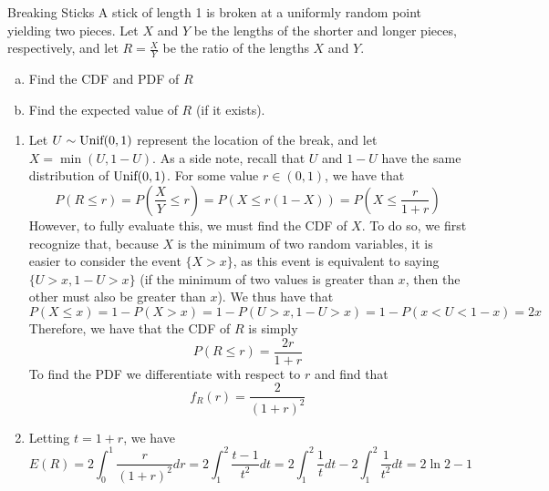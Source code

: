 \documentclass[11.5pt]{article}
\begin{document}




\begin{exercise}{Breaking Sticks}
A stick of length 1 is broken at a uniformly random point yielding two pieces. Let $X$ and $Y$ be the lengths of the shorter and longer pieces, respectively, and let $R = \frac{X}{Y}$ be the ratio of the lengths $X$ and $Y$. 
\begin{enumerate} [(a)]
\item Find the CDF and PDF of $R$
\item Find the expected value of $R$ (if it exists). 
\end{enumerate}

\begin{solution}{3} 
\begin{enumerate}
\item Let $U \sim \textrm{Unif}(0,1)$ represent the location of the break, and let $X = \min(U, 1-U)$. As a side note, recall that $U$ and $1-U$ have the same distribution of $\textrm{Unif}(0,1)$. For some value $r \in (0,1)$, we have that 
    $$P(R \leq r) = P(\frac{X}{Y} \leq r) = 
    P(X \leq r (1-X)) = P (X \leq \frac{r}{1+r})$$
However, to fully evaluate this, we must find the CDF of $X$. To do so, we first recognize that, because $X$ is the minimum of two random variables, it is easier to consider the event $\{X > x\}$, as this event is equivalent to saying $\{U > x, 1-U > x\}$ (if the minimum of two values is greater than $x$, then the other must also be greater than $x$). We thus have that
    $$P(X \leq x) = 1 - P(X > x) = 1-P(U > x, 1-U >x) = 1 -
    P(x < U < 1-x) = 2x$$
Therefore, we have that the CDF of $R$ is simply
    $$P(R \leq r) = \frac{2r}{1+r}$$
To find the PDF we differentiate with respect to $r$ and find that 
    $$f_R(r) = \frac{2}{(1+r)^2}$$
\item Letting $t = 1+r$, we have 
    $$E(R) = 2 \int_0^1 \frac{r}{(1+r)^2} dr = 2 \int_1^2 
    \frac{t-1}{t^2} dt = 2\int_1^2 \frac{1}{t} dt - 2 
    \int_1^2 \frac{1}{t^2} dt = 2 \ln 2 - 1$$
\end{enumerate}
\end{solution}
\end{exercise}
\end{document}
